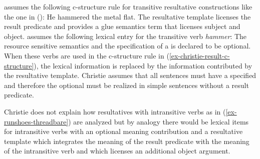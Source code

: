 \citet{Christie2010a} assumes the following c-structure rule for transitive resultative
constructions like the one in ():
\ea
He hammered the metal flat.
\z
\ea
\label{ex-christie-result-c-structure}
\z
The resultative template licenses the result predicate and provides a glue semantics term that
licenses subject and object. \citet{Christie2010a} assumes the following lexical entry for
the transitive verb \emph{hammer}:
\ea
{}
\z
The resource sensitive semantics and the specification of a \predv is declared to be optional. When
these verbs are used in the c-structure rule in (\ref{ex-christie-result-c-structure}), the lexical
information is replaced by the information contributed by the resultative template. Christie assumes
that all sentences must have a specified \predv and therefore the optional \predv must be realized
in simple sentences without a result predicate.  

Christie does not explain how resultatives with intransitive verbs as in (\ref{ex-runshoes-threadbare}) are analyzed but by analogy there
would be lexical items for intransitive verbs with an optional meaning contribution and a
resultative template which integrates the meaning of the result predicate with the meaning of the
intransitive verb and which licenses an additional object argument.

